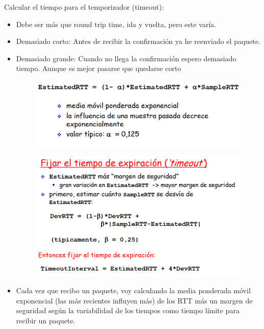 \documentclass[12pt, twoside, openright]{report} %
\begin{document}
	Calcular el tiempo para el temporizador (timeout):

    \begin{itemize}
    \item
      Debe ser más que round trip time, ida y vuelta, pero este varía.
    \item
      Demasiado corto: Antes de recibir la confirmación ya he reenviado
      el paquete.
    \item
      Demasiado grande: Cuando no llega la confirmación espero demasiado
      tiempo. Aunque es mejor pasarse que quedarse corto
	  \begin{figure}[H]
		{\includegraphics[scale=.45]{Untitled 6.png}}
	\end{figure}
	\begin{figure}[H]
		{\includegraphics[scale=.45]{Untitled 7.png}}
	\end{figure}
    \item
      Cada vez que recibo un paquete, voy calculando la media ponderada
      móvil exponencial (las más recientes influyen más) de los RTT más
      un margen de seguridad según la variabilidad de los tiempos como
      tiempo límite para recibir un paquete.
    \end{itemize}
\end{document}
